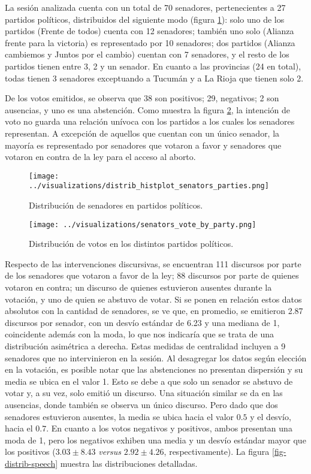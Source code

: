 La sesi\'on analizada cuenta con un total de 70 senadores,
pertenecientes a 27 partidos pol\'iticos, distribuidos del
siguiente modo (figura \ref{fig-distrib-senators}): 
solo uno de los partidos (Frente de todos) cuenta con 12
senadores; tambi\'en uno solo (Alianza frente para la victoria) es
representado por 10 senadores; dos partidos (Alianza cambiemos y
Juntos por el cambio) cuentan con 7 senadores, y el resto de los
partidos tienen entre 3, 2 y un senador.
En cuanto a las provincias (24 en total), todas tienen 3 senadores
exceptuando a Tucum\'an y a La Rioja que tienen solo 2.

De los votos emitidos, se observa que 38 son positivos; 29, negativos;
2 son ausencias, y uno es una abstenci\'on.
Como muestra la figura \ref{fig-distrib-vote}, la intenci\'on
de voto no guarda una relaci\'on un\'ivoca con los partidos a los cuales los
senadores representan. A excepci\'on de aquellos que cuentan con un \'unico
senador, la mayor\'ia es representado por senadores que votaron a favor y senadores
que votaron en contra de la ley para el acceso al aborto.

\begin{figure}[h!]
    \centering
    \texttt{[image: ../visualizations/distrib\_histplot\_senators\_parties.png]}
    \caption{Distribuci\'on de senadores en partidos pol\'iticos.}
    \label{fig-distrib-senators}
\end{figure}

\begin{figure}[h!]
\centering
\texttt{[image: ../visualizations/senators\_vote\_by\_party.png]}
\caption{Distribuci\'on de votos en los distintos partidos pol\'iticos.}
\label{fig-distrib-vote}
\end{figure}

Respecto de las intervenciones discursivas, se encuentran 111 discursos
por parte de los senadores que votaron a favor de la ley; 88 discursos por parte
de quienes votaron en contra; un discurso de quienes estuvieron ausentes
durante la votaci\'on, y uno de quien se abstuvo de votar.
Si se ponen en relaci\'on estos datos absolutos con la cantidad de senadores,
se ve que, en promedio, se emitieron
2.87 discursos por senador, con un desv\'io est\'andar de 6.23 y una mediana de 1,
coincidente adem\'as
con la moda, lo que nos indicar\'ia que se trata de una distribuci\'on asim\'etrica a derecha.
Estas medidas de centralidad incluyen a 9 senadores que no intervinieron en
la sesi\'on.
Al desagregar los datos seg\'un elecci\'on en la votaci\'on, es posible notar que las
abstenciones no presentan
dispersi\'on y su media se ubica en el valor 1. Esto se debe a que solo un senador
se abstuvo de votar y, a su vez, solo emiti\'o un discurso.
Una situaci\'on similar se da en las ausencias, donde tambi\'en se observa un \'unico discurso.
Pero dado que dos senadores estuvieron ausentes, la media se ubica hacia el valor $0.5$ y
el desv\'io, hacia el $0.7$.
En cuanto a los votos negativos y positivos, ambos presentan una moda de 1,
pero los negativos
exhiben una media y un desv\'io est\'andar mayor que los positivos
($3.03\pm8.43$ \textit{versus} $2.92\pm4.26$, respectivamente).
La figura \ref{fig-distrib-speech} muestra las distribuciones detalladas.

